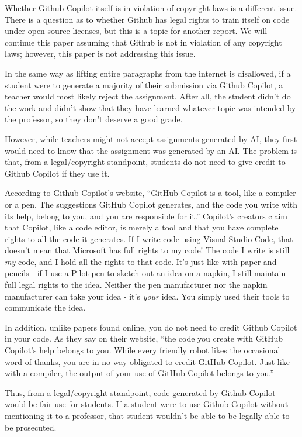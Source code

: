 \documentclass[12pt]{article}
\begin{document}
Whether Github Copilot itself is in violation of copyright laws is a
different issue. There is a question as to whether Github has legal
rights to train itself on code under open-source licenses, but this is a
topic for another report. We will continue this paper assuming that
Github is not in violation of any copyright laws; however, this paper is
not addressing this issue.

In the same way as lifting entire paragraphs from the internet is
disallowed, if a student were to generate a majority of their submission
via Github Copilot, a teacher would most likely reject the assignment.
After all, the student didn't do the work and didn't show that they have
learned whatever topic was intended by the professor, so they don't
deserve a good grade.

However, while teachers might not accept assignments generated by AI,
they first would need to know that the assignment was generated by an
AI. The problem is that, from a legal/copyright standpoint, students do
not need to give credit to Github Copilot if they use it.

According to Github Copilot's website, ``GitHub Copilot is a tool, like
a compiler or a pen. The suggestions GitHub Copilot generates, and the
code you write with its help, belong to you, and you are responsible for
it.'' Copilot's creators claim that Copilot, like a code editor, is
merely a tool and that you have complete rights to all the code it
generates. If I write code using Visual Studio Code, that doesn't mean
that Microsoft has full rights to my code! The code I write is still
\emph{my} code, and I hold all the rights to that code. It's just like
with paper and pencils - if I use a Pilot pen to sketch out an idea on a
napkin, I still maintain full legal rights to the idea. Neither the pen
manufacturer nor the napkin manufacturer can take your idea - it's
\emph{your} idea. You simply used their tools to communicate the idea.

In addition, unlike papers found online, you do not need to credit
Github Copilot in your code. As they say on their website, ``the code
you create with GitHub Copilot's help belongs to you. While every
friendly robot likes the occasional word of thanks, you are in no way
obligated to credit GitHub Copilot. Just like with a compiler, the
output of your use of GitHub Copilot belongs to you.''

Thus, from a legal/copyright standpoint, code generated by Github
Copilot would be fair use for students. If a student were to use Github
Copilot without mentioning it to a professor, that student wouldn't be
able to be legally able to be prosecuted.
\end{document}
